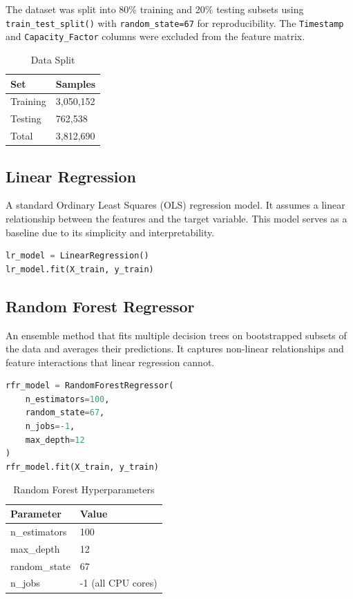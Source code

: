 \documentclass[12pt, a4paper]{article}
\begin{document}
The dataset was split into 80\% training and 20\% testing subsets using \texttt{train\_test\_split()} with \texttt{random\_state=67} for reproducibility. The \texttt{Timestamp} and \texttt{Capacity\_Factor} columns were excluded from the feature matrix.

\begin{table}[H]
    \centering
    \caption{Data Split}
    \begin{tabular}{ll}
        \toprule
        \textbf{Set} & \textbf{Samples} \\
        \midrule
        Training & 3,050,152 \\
        Testing & 762,538 \\
        Total & 3,812,690 \\
        \bottomrule
    \end{tabular}
\end{table}

\subsection{Linear Regression}

A standard Ordinary Least Squares (OLS) regression model. It assumes a linear relationship between the features and the target variable. This model serves as a baseline due to its simplicity and interpretability.

\begin{lstlisting}[language=Python]
lr_model = LinearRegression()
lr_model.fit(X_train, y_train)
\end{lstlisting}

\clearpage
\subsection{Random Forest Regressor}

An ensemble method that fits multiple decision trees on bootstrapped subsets of the data and averages their predictions. It captures non-linear relationships and feature interactions that linear regression cannot.

\begin{lstlisting}[language=Python]
rfr_model = RandomForestRegressor(
    n_estimators=100,
    random_state=67,
    n_jobs=-1,
    max_depth=12
)
rfr_model.fit(X_train, y_train)
\end{lstlisting}

\begin{table}[H]
    \centering
    \caption{Random Forest Hyperparameters}
    \begin{tabular}{ll}
        \toprule
        \textbf{Parameter} & \textbf{Value} \\
        \midrule
        n\_estimators & 100 \\
        max\_depth & 12 \\
        random\_state & 67 \\
        n\_jobs & -1 (all CPU cores) \\
        \bottomrule
    \end{tabular}
\end{table}
\end{document}
